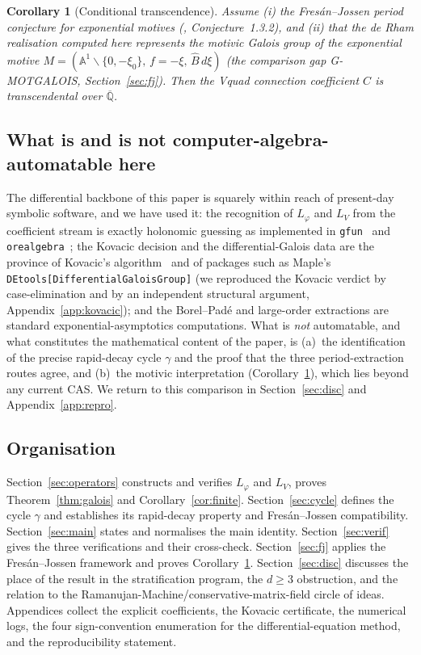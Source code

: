 \documentclass[11pt,reqno]{amsart}
\renewcommand{\_}{\vquadorigunderscore\allowbreak}
\theoremstyle{plain}
\newtheorem{corollary}[theorem]{Corollary}
\theoremstyle{definition}
\newcommand{\Bhat}{\widehat{B}}
\newcommand{\Lphi}{L_{\varphi}}
\newcommand{\LV}{L_{V}}
\newcommand{\Qbar}{\overline{\mathbb{Q}}}
\newcommand{\xizero}{\xi_0}
\providecommand{\C}{}\renewcommand{\C}{C}
\begin{document}
\begin{corollary}[Conditional transcendence]\label{cor:transc}
Assume \emph{(i)} the Fres\'an--Jossen period conjecture for exponential motives
\textup{(\cite{FJ}, Conjecture~1.3.2)}, and \emph{(ii)} that the de Rham realisation computed
here represents the motivic Galois group of the exponential motive
$M=(\mathbb{A}^1\smallsetminus\{0,-\xizero\},\,f=-\xi,\,\Bhat\,d\xi)$ \textup{(the comparison
gap G-MOTGALOIS, Section~\ref{sec:fj})}. Then the V\_quad connection coefficient $\C$ is
transcendental over $\Qbar$.
\end{corollary}

\subsection{What is and is not computer-algebra-automatable here}
The differential backbone of this paper is squarely within reach of present-day symbolic
software, and we have used it: the recognition of $\Lphi$ and $\LV$ from the coefficient stream
is exactly holonomic guessing as implemented in \texttt{gfun}~\cite{gfun} and
\texttt{ore\_algebra}~\cite{oreAlgebra}; the Kovacic decision and the differential-Galois data
are the province of Kovacic's algorithm~\cite{Kovacic} and of packages such as Maple's
\texttt{DEtools[DifferentialGaloisGroup]} (we reproduced the Kovacic verdict by case-elimination
and by an independent structural argument, Appendix~\ref{app:kovacic}); and the Borel--Pad\'e
and large-order extractions are standard exponential-asymptotics computations. What is
\emph{not} automatable, and what constitutes the mathematical content of the paper, is
(a)~the identification of the precise rapid-decay cycle $\gamma$ and the proof that the three
period-extraction routes agree, and (b)~the motivic interpretation
(Corollary~\ref{cor:transc}), which lies beyond any current CAS. We return to this comparison
in Section~\ref{sec:disc} and Appendix~\ref{app:repro}.

\subsection{Organisation}
Section~\ref{sec:operators} constructs and verifies $\Lphi$ and $\LV$, proves
Theorem~\ref{thm:galois} and Corollary~\ref{cor:finite}. Section~\ref{sec:cycle} defines the
cycle $\gamma$ and establishes its rapid-decay property and Fres\'an--Jossen compatibility.
Section~\ref{sec:main} states and normalises the main identity. Section~\ref{sec:verif} gives
the three verifications and their cross-check. Section~\ref{sec:fj} applies the
Fres\'an--Jossen framework and proves Corollary~\ref{cor:transc}.
Section~\ref{sec:disc} discusses the place of the result in the stratification program, the
$d\ge3$ obstruction, and the relation to the Ramanujan-Machine/conservative-matrix-field
circle of ideas. Appendices collect the explicit coefficients, the Kovacic certificate, the
numerical logs, the four sign-convention enumeration for the differential-equation method, and
the reproducibility statement.
\end{document}
